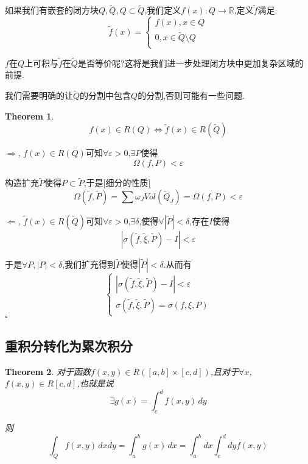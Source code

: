 \documentclass[11pt,hyperref,a4paper,UTF8]{ctexart}
\newtheorem{theorem}{Theorem}[subsection]
\newenvironment{cproof}{%
\heiti{证明}\kaishu
}{%
  \hfill $\square$
  \par\bigskip
}
\newcommand{\RR}{\mathbb{R}}
\begin{document}
\begin{CJK}{UTF8}{gkai}
如果我们有嵌套的闭方块$Q,\tilde{Q},Q \subset \tilde{Q}$,我们定义$f(x): Q \to \RR$,定义$\tilde{f}$满足:
\[\tilde{f}(x) = \begin{cases}
  f(x), x \in Q\\
  0, x \in \tilde{Q}\setminus Q\\
\end{cases}\]

$f$在$Q$上可积与$\tilde{f}$在$\tilde{Q}$是否等价呢?这将是我们进一步处理闭方块中更加复杂区域的前提.

我们需要明确的让$\tilde{Q}$的分割中包含$Q$的分割,否则可能有一些问题.

\begin{theorem}
  \[f(x) \in R(Q) \Leftrightarrow \tilde{f}(x) \in R(\tilde{Q})\]
\end{theorem}

\begin{cproof}
  $\Rightarrow$, $f(x) \in R(Q)$可知$\forall \varepsilon > 0$,$\exists P$使得
  \[\Omega(f,P) < \varepsilon\]

  构造扩充$\tilde{P}$使得$P \subset \tilde{P}$,于是[细分的性质]
  \[\Omega(\tilde{f},\tilde{P}) = \sum \omega_J Vol(\tilde{Q}_J) = \Omega(f,P) < \varepsilon\]

  $\Leftarrow$, $\tilde{f}(x) \in R(\tilde{Q})$可知$\forall \varepsilon > 0$,$\exists \delta$,使得$\forall |\tilde{P}| < \delta$,存在$I$使得
  \[|\sigma(\tilde{f},\tilde{\xi},\tilde{P}) - I| < \varepsilon\]

  于是$\forall P, |P| < \delta$,我们扩充得到$\tilde{P}$使得$|\tilde{P}| < \delta$.从而有
  \[\begin{cases}
    |\sigma(\tilde{f},\tilde{\xi},\tilde{P}) - I| < \varepsilon\\
    \sigma(\tilde{f},\tilde{\xi},\tilde{P}) = \sigma(f,\xi,P)
  \end{cases}\]
\end{cproof}

\subsection{重积分转化为累次积分}

\begin{theorem}
  对于函数$f(x,y) \in R([a,b]\times [c,d])$,且对于$\forall x$,$f(x,y) \in R [c,d]$,也就是说
  \[\exists g(x) = \int_{c}^{d}f(x,y)\, dy\]

  则
  \[\int_Q f(x,y)\, dx dy = \int_{a}^{b} g(x)\, dx = \int_{a}^{b}dx \int_{c}^{d}dy f(x,y)\]
\end{theorem}


\end{CJK}
\end{document}
